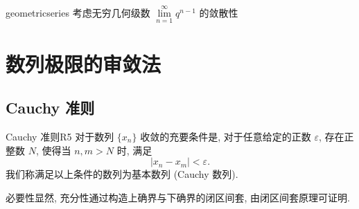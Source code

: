 \documentclass[cn,toc=twocol]{elegantbook}
\newcommand{\N}{\mathbb{N}}
\begin{document}

%

\begin{example}{}{geometricseries}
	考虑无穷几何级数 $\lim\limits_{n=1}^\infty q^{n-1}$ 的敛散性
\end{example}

\begin{solution}
\end{solution}


\section{数列极限的审敛法}
\subsection{Cauchy 准则}
\begin{theorem}{Cauchy 准则}{R5}
	对于数列 $\{x_n\}$ 收敛的充要条件是, 对于任意给定的正数 $\varepsilon$, 存在正整数 $N$, 使得当 $n, m > N$ 时, 满足 
	\[
		|x_n-x_m| < \varepsilon.
	\]
	我们称满足以上条件的数列为基本数列 (Cauchy 数列).
\end{theorem}

\begin{idea*}
必要性显然, 充分性通过构造上确界与下确界的闭区间套, 由闭区间套原理可证明.	
\end{idea*}
\end{document}

